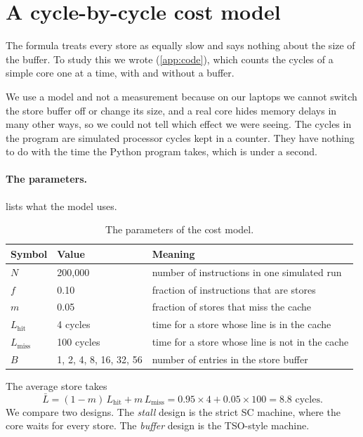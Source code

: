 \section{A cycle-by-cycle cost model}
\label{sec:cpimodel}

The formula treats every store as equally slow and says nothing about the size of the buffer. To study this we wrote  (\cref{app:code}), which counts the cycles of a simple core one at a time, with and without a buffer.

We use a model and not a measurement because on our laptops we cannot switch the store buffer off or change its size, and a real core hides memory delays in many other ways, so we could not tell which effect we were seeing. The cycles in the program are simulated processor cycles kept in a counter. They have nothing to do with the time the Python program takes, which is under a second.

\paragraph{The parameters.}  lists what the model uses.

\begin{table}[!htbp]
\centering\small
\caption{The parameters of the cost model.}
\label{tab:cpiparams}
\begin{tabularx}{\textwidth}{@{}llX@{}}
\toprule
Symbol & Value & Meaning\\
\midrule
$N$ & 200{,}000 & number of instructions in one simulated run\\
$f$ & 0.10 & fraction of instructions that are stores\\
$m$ & 0.05 & fraction of stores that miss the cache\\
$L_{\text{hit}}$ & 4 cycles & time for a store whose line is in the cache\\
$L_{\text{miss}}$ & 100 cycles & time for a store whose line is not in the cache\\
$B$ & 1, 2, 4, 8, 16, 32, 56 & number of entries in the store buffer\\
\bottomrule
\end{tabularx}
\end{table}

The average store takes
\[
\bar{L} = (1 - m)\,L_{\text{hit}} + m\,L_{\text{miss}} = 0.95 \times 4 + 0.05 \times 100 = 8.8 \text{ cycles.}
\]
We compare two designs. The \emph{stall} design is the strict SC machine, where the core waits for every store. The \emph{buffer} design is the TSO-style machine.

